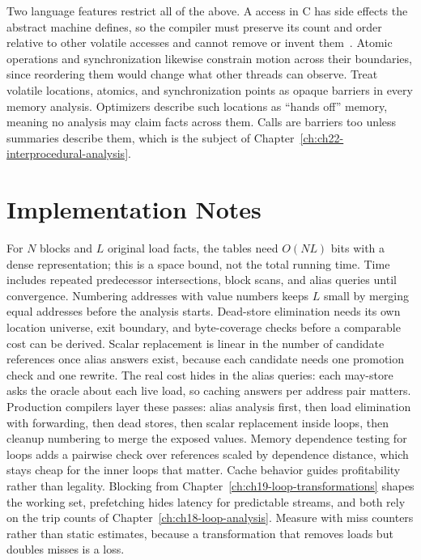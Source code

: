 Two language features restrict all of the above.
A  access in C has side effects the abstract machine defines, so the compiler must preserve its count and order relative to other volatile accesses and cannot remove or invent them~\cite{wg14-2011-c11}.
Atomic operations and synchronization likewise constrain motion across their boundaries, since reordering them would change what other threads can observe.
Treat volatile locations, atomics, and synchronization points as opaque barriers in every memory analysis.
Optimizers describe such locations as \enquote{hands off} memory, meaning no analysis may claim facts across them.
Calls are barriers too unless summaries describe them, which is the subject of Chapter~\ref{ch:ch22-interprocedural-analysis}.

\section{Implementation Notes}
\label{sec:ch21-implementation}

For $N$ blocks and $L$ original load facts, the tables need $O(NL)$ bits with a dense representation; this is a space bound, not the total running time.
Time includes repeated predecessor intersections, block scans, and alias queries until convergence.
Numbering addresses with value numbers keeps $L$ small by merging equal addresses before the analysis starts.
Dead-store elimination needs its own location universe, exit boundary, and byte-coverage checks before a comparable cost can be derived.
Scalar replacement is linear in the number of candidate references once alias answers exist, because each candidate needs one promotion check and one rewrite.
The real cost hides in the alias queries: each may-store asks the oracle about each live load, so caching answers per address pair matters.
Production compilers layer these passes: alias analysis first, then load elimination with forwarding, then dead stores, then scalar replacement inside loops, then cleanup numbering to merge the exposed values.
Memory dependence testing for loops adds a pairwise check over references scaled by dependence distance, which stays cheap for the inner loops that matter.
Cache behavior guides profitability rather than legality.
Blocking from Chapter~\ref{ch:ch19-loop-transformations} shapes the working set, prefetching hides latency for predictable streams, and both rely on the trip counts of Chapter~\ref{ch:ch18-loop-analysis}.
Measure with miss counters rather than static estimates, because a transformation that removes loads but doubles misses is a loss.

